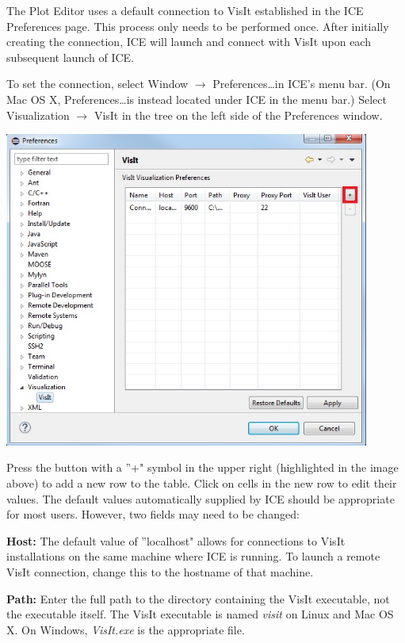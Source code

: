 \documentclass{article}
\begin{document}
The Plot Editor uses a default connection to VisIt established in the ICE
Preferences page. This process only needs to be performed once. After initially
creating the connection, ICE will launch and connect with VisIt upon each
subsequent launch of ICE.

To set the connection, select Window $\rightarrow$ Preferences\ldots in ICE's
menu bar. (On Mac OS X, Preferences\ldots is instead located under ICE in the
menu bar.) Select Visualization $\rightarrow$ VisIt in the tree on the left side
of the Preferences window.

\begin{center}
\includegraphics[width=12cm]{images/VisItPreferencePage_ICE}
\end{center}

Press the button with a ''+" symbol in the upper right (highlighted in the image
above) to add a new row to the table. Click on cells in the new row to edit
their values. The default values automatically supplied by ICE should be
appropriate for most users. However, two fields may need to be changed:

\textbf{Host:} The default value of ''localhost" allows for connections to VisIt
installations on the same machine where ICE is running. To launch a remote VisIt
connection, change this to the hostname of that machine.

\textbf{Path:} Enter the full path to the directory containing the VisIt
executable, not the executable itself. The VisIt executable is named
\textit{visit} on Linux and Mac OS X. On Windows, \textit{VisIt.exe} is the
appropriate file.
\end{document}
